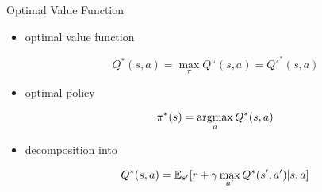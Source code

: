 \begin{frame}{Optimal Value Function}
      \begin{itemize}
        \item optimal value function

      \begin{equation*}
        Q^{*}(s,a)=\max_{\pi} Q^{\pi}(s,a)=Q^{\pi^*}(s,a)
      \end{equation*}

      \item optimal policy

      \begin{equation*}
        \pi^{*}(s)=\operatorname*{argmax}_{a}Q^*(s,a)
      \end{equation*}

    \item decomposition into

      \begin{equation*}
        Q^{*}(s,a)=\operatorname{\mathbb{E}}_{s'}[r+\gamma \max_{a'}Q^{*}(s',a')|s,a]
      \end{equation*}

      \end{itemize}
\end{frame}

